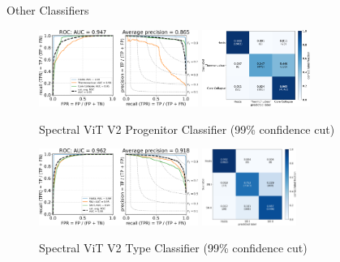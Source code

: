 \begin{frame}{Other Classifiers}
    \begin{figure}
        \centering
        \includegraphics[height=2.5cm]{figures/v2_applications/vit_model_V2roc99_proj_e26.png}
        \quad
        \includegraphics[height=2.5cm]{figures/v2_applications/vit_model_V2cm99_proj_e26.png}
        \caption{Spectral ViT V2 Progenitor Classifier (99\% confidence cut)\label{fig:v2_99_proj_qual}}
        \includegraphics[height=2.5cm]{figures/v2_applications/vit_model_V2roc99_type_e26.png}
        \quad
        \includegraphics[height=2.5cm]{figures/v2_applications/vit_model_V2cm99_type_e26.png}
        \caption{Spectral ViT V2 Type Classifier (99\% confidence cut)\label{fig:v2_99_type_qual}}
    \end{figure}
\end{frame}






